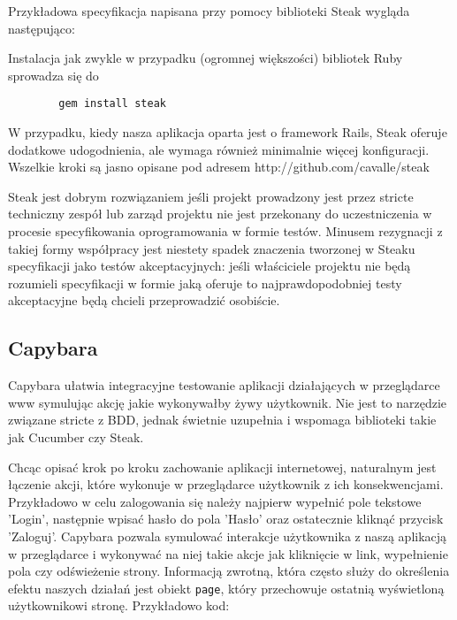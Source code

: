       Przykładowa specyfikacja napisana przy pomocy biblioteki Steak wygląda następująco:
      
      
      
      Instalacja jak zwykle w przypadku (ogromnej większości) bibliotek Ruby sprowadza się do
      
      \begin{lstlisting}
        gem install steak
      \end{lstlisting}
      
      W przypadku, kiedy nasza aplikacja oparta jest o framework Rails, Steak oferuje dodatkowe udogodnienia, ale wymaga również minimalnie więcej konfiguracji. Wszelkie kroki są jasno opisane pod adresem http://github.com/cavalle/steak
      
      Steak jest dobrym rozwiązaniem jeśli projekt prowadzony jest przez stricte techniczny zespół lub zarząd projektu nie jest przekonany do uczestniczenia w procesie specyfikowania oprogramowania w formie testów. Minusem rezygnacji z takiej formy współpracy jest niestety spadek znaczenia tworzonej w Steaku specyfikacji jako testów akceptacyjnych: jeśli właściciele projektu nie będą rozumieli specyfikacji w formie jaką oferuje to najprawdopodobniej testy akceptacyjne będą chcieli przeprowadzić osobiście.
    
    \subsection{Capybara}  

      Capybara ułatwia integracyjne testowanie aplikacji działających w przeglądarce www symulując akcję jakie wykonywałby żywy użytkownik. Nie jest to narzędzie związane stricte z BDD, jednak świetnie uzupełnia i wspomaga biblioteki takie jak Cucumber czy Steak.
      
      Chcąc opisać krok po kroku zachowanie aplikacji internetowej, naturalnym jest łączenie akcji, które wykonuje w przeglądarce użytkownik z ich konsekwencjami. Przykładowo w celu zalogowania się należy najpierw wypełnić pole tekstowe 'Login', następnie wpisać hasło do pola 'Hasło' oraz ostatecznie kliknąć przycisk 'Zaloguj'. Capybara pozwala symulować interakcje użytkownika z naszą aplikacją w przeglądarce i wykonywać na niej takie akcje jak kliknięcie w link, wypełnienie pola czy odświeżenie strony.
      Informacją zwrotną, która często służy do określenia efektu naszych działań jest obiekt \verb+page+, który przechowuje ostatnią wyświetloną użytkownikowi stronę. Przykładowo kod:
      
